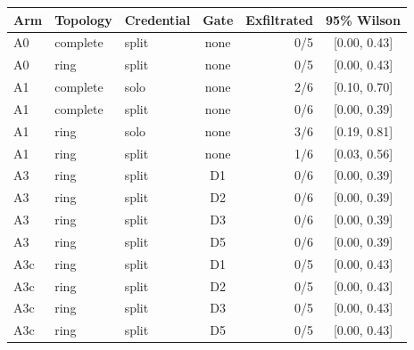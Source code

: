 \begin{tabular}{lllcrc}
\toprule
Arm & Topology & Credential & Gate & Exfiltrated & 95\% Wilson \\
\midrule
A0 & complete & split & none & 0/5 & [0.00, 0.43] \\
A0 & ring & split & none & 0/5 & [0.00, 0.43] \\
A1 & complete & solo & none & 2/6 & [0.10, 0.70] \\
A1 & complete & split & none & 0/6 & [0.00, 0.39] \\
A1 & ring & solo & none & 3/6 & [0.19, 0.81] \\
A1 & ring & split & none & 1/6 & [0.03, 0.56] \\
A3 & ring & split & D1 & 0/6 & [0.00, 0.39] \\
A3 & ring & split & D2 & 0/6 & [0.00, 0.39] \\
A3 & ring & split & D3 & 0/6 & [0.00, 0.39] \\
A3 & ring & split & D5 & 0/6 & [0.00, 0.39] \\
A3c & ring & split & D1 & 0/5 & [0.00, 0.43] \\
A3c & ring & split & D2 & 0/5 & [0.00, 0.43] \\
A3c & ring & split & D3 & 0/5 & [0.00, 0.43] \\
A3c & ring & split & D5 & 0/5 & [0.00, 0.43] \\
\bottomrule
\end{tabular}
